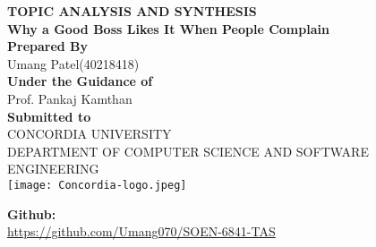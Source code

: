 \documentclass[a4paper,12pt]{report}
\begin{document}
\begin{titlepage}
   \begin{center}
       \vspace*{-8ex}
        \begin{figure}[h!]
  \centering
\end{figure}

       \textbf{\large TOPIC ANALYSIS AND SYNTHESIS }\\[0.3in]
        \textbf{\large Why a Good Boss Likes It When People Complain} \\ [0.3in]
        \textbf{\large Prepared By} \\[0.1in]
        \normal Umang Patel(40218418)\\[0.3in]
       

        \textbf{\large Under the Guidance of}\\[0.15in]
        \normal Prof. Pankaj Kamthan\\[0.4in]

        \textbf{\large Submitted to}\\[0.15in]
        \normal CONCORDIA UNIVERSITY\\[0.05in]
        \normal DEPARTMENT OF COMPUTER SCIENCE AND SOFTWARE ENGINEERING\\[0.2in]
        \texttt{[image: Concordia-logo.jpeg]}

       \vspace{1.0cm}
      
        \textbf{Github:}\\\url{https://github.com/Umang070/SOEN-6841-TAS}\\[0.2in]
    
       \vfill
   \end{center}
\end{titlepage}
\end{document}
